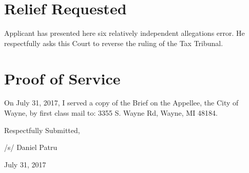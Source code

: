 \documentclass[12pt,\documentclassflag]{michiganCourtOfAppealsBrief}
\begin{document}
\section{Relief Requested}

Applicant has presented here six relatively independent allegations error. He respectfully asks this Court to reverse the ruling of the Tax Tribunal. 
 

\section{Proof of Service}

On July 31, 2017, I served a copy of the Brief on the Appellee, the City of Wayne, by first class mail to: 3355 S. Wayne Rd, Wayne, MI 48184. 


\vspace{1\baselineskip}

{ \setlength{\leftskip}{3.5in}

  Respectfully Submitted,

  /s/ Daniel Patru

  July 31, 2017

  \setlength{\leftskip}{0pt}}

\newpage\empty%
\end{document}
